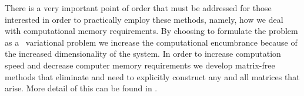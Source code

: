 There is a very important point of order that must be addressed for those interested
in order to practically employ these methods, namely, how we deal with computational
memory requirements. By choosing to formulate the problem as a \spt\ variational
problem we increase the computational encumbrance because of the increased dimensionality
of the system. In order to increase computation speed and decrease computer memory requirements
we develop matrix-free methods that eliminate and need to explicitly construct any and
all matrices that arise. More detail of this can be found in .